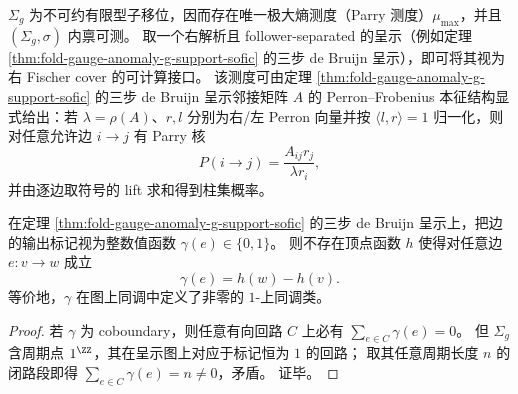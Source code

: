 \begin{corollary}[有限型支撑上的内禀唯一极大熵态]\label{cor:fold-gauge-anomaly-mismatch-language-intrinsic-ergodic}
\(\Sigma_g\) 为不可约有限型子移位，因而存在唯一极大熵测度（Parry 测度）\(\mu_{\max}\)，并且 \((\Sigma_g,\sigma)\) 内禀可测。
取一个右解析且 follower-separated 的呈示（例如定理 \ref{thm:fold-gauge-anomaly-g-support-sofic} 的三步 de Bruijn 呈示），即可将其视为右 Fischer cover 的可计算接口。
该测度可由定理 \ref{thm:fold-gauge-anomaly-g-support-sofic} 的三步 de Bruijn 呈示邻接矩阵 \(A\) 的 Perron--Frobenius 本征结构显式给出：若 \(\lambda=\rho(A)\)、\(r,l\) 分别为右/左 Perron 向量并按 \(\langle l,r\rangle=1\) 归一化，则对任意允许边 \(i\to j\) 有 Parry 核
\[
P(i\to j)=\frac{A_{ij}r_j}{\lambda r_i},
\]
并由逐边取符号的 lift 求和得到柱集概率。
\end{corollary}

\begin{proposition}\label{prop:fold-gauge-anomaly-mismatch-language-non-coboundary}
在定理 \ref{thm:fold-gauge-anomaly-g-support-sofic} 的三步 de Bruijn 呈示上，把边的输出标记视为整数值函数 \(\gamma(e)\in\{0,1\}\)。
则不存在顶点函数 \(h\) 使得对任意边 \(e:v\to w\) 成立
\[
\gamma(e)=h(w)-h(v).
\]
等价地，\(\gamma\) 在图上同调中定义了非零的 \(1\)-上同调类。
\end{proposition}
\begin{proof}
若 \(\gamma\) 为 coboundary，则任意有向回路 \(C\) 上必有 \(\sum_{e\in C}\gamma(e)=0\)。
但 \(\Sigma_g\) 含周期点 \(1^{\ZZ}\)，其在呈示图上对应于标记恒为 \(1\) 的回路；
取其任意周期长度 \(n\) 的闭路段即得 \(\sum_{e\in C}\gamma(e)=n\neq 0\)，矛盾。
证毕。
\end{proof}

\endinput
